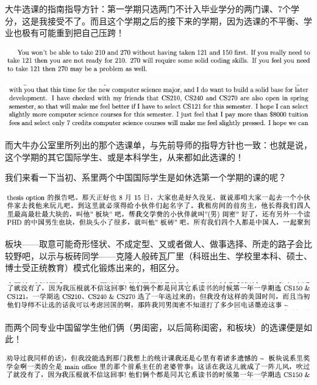 \documentclass[9pt, b5paper]{article}
\begin{document}
大牛选课的指南指导方针：第一学期只选两门不计入毕业学分的两门课、7个学分，这是我接受不了。而且这个学期之后的接下来的学期，因为选课的不平衡、学业也极有可能重到把自己压跨！

\begin{center}
\includegraphics[width=.9\linewidth]{./pic/backups_plans_20210424_114045.png}
\end{center}

\begin{center}
\includegraphics[width=.9\linewidth]{./pic/backups_plans_20210424_114115.png}
\end{center}

而大牛办公室里所列出的那个选课单，与先前导师的指导方针也一致：也就是说，这个学期的其它国际学生、或是本科学生，从来都如此选课的！

我们来看一下当初、系里两个中国国际学生是如休选第一个学期的课的呢？

\begin{center}
\includegraphics[width=.9\linewidth]{./pic/backups_plans_20210424_114632.png}
\end{center}

板块——取意可能奇形怪状、不成定型、又或者做人、做事选择、所走的路子会比较野吧，以示与板砖同学——克隆人般砖瓦厂里（科班出生、学校里本科、硕士、博士受正统教育）模式化锻炼出来的，相区分。

\begin{center}
\includegraphics[width=.9\linewidth]{./pic/backups_plans_20210424_114938.png}
\end{center}

而两个同专业中国留学生他们俩（男闺密，以后简称闺密，和板块）的选课便是如此！

\begin{center}
\includegraphics[width=.9\linewidth]{./pic/backups_plans_20210424_114917.png}
\end{center}
\end{document}
